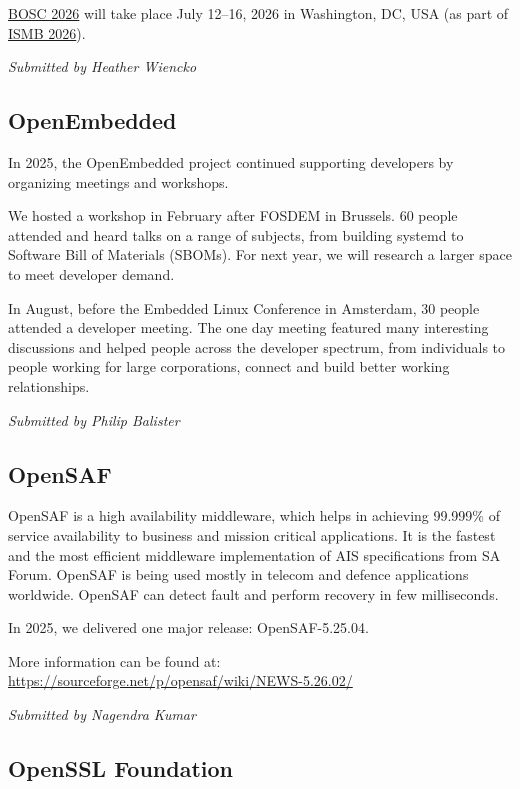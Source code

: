 \documentclass[a4paper]{report}
\begin{document}
\href{https://www.open-bio.org/events/bosc-2026/}{BOSC 2026} will take place July 12--16, 2026 in Washington, DC, USA (as part of \href{https://www.iscb.org/ismb2026/home}{ISMB 2026}).

{\em Submitted by Heather Wiencko}

\subsection{OpenEmbedded}

In 2025, the OpenEmbedded project continued supporting developers by organizing meetings and workshops.

We hosted a workshop in February after FOSDEM in Brussels. 60 people attended and heard talks on a range of subjects, from building systemd to Software Bill of Materials (SBOMs). For next year, we will research a larger space to meet developer demand.

In August, before the Embedded Linux Conference in Amsterdam, 30 people attended a developer meeting. The one day meeting featured many interesting discussions and helped people across the developer spectrum, from individuals to people working for large corporations, connect and build better working relationships.

{\em Submitted by Philip Balister}

\subsection{OpenSAF}

OpenSAF is a high availability middleware, which helps in achieving 99.999\% of service availability to business and mission critical applications. It is the fastest and the most efficient middleware implementation of AIS specifications from SA Forum. OpenSAF is being used mostly in telecom and defence applications worldwide. OpenSAF can detect fault and perform recovery in few milliseconds.

In 2025, we delivered one major release: OpenSAF-5.25.04.

More information can be found at:
\href{https://sourceforge.net/p/opensaf/wiki/NEWS-5.26.02/}{https://sourceforge.net/p/opensaf/wiki/NEWS-5.26.02/}

{\em Submitted by Nagendra Kumar}

\subsection{OpenSSL Foundation}
\end{document}
